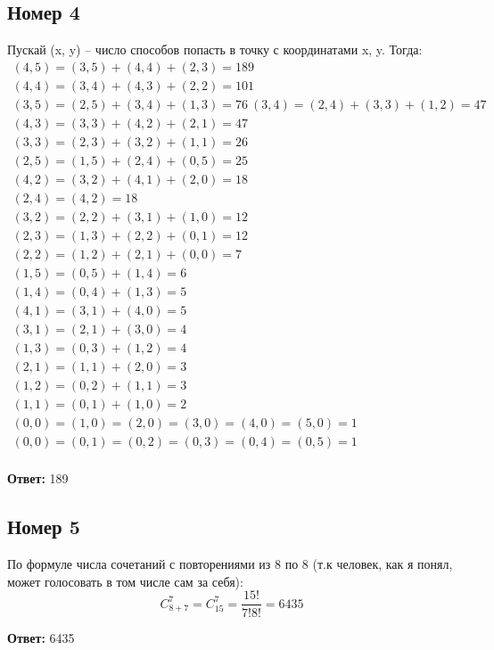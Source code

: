 \documentclass[a4paper,12pt]{article}
\begin{document}
\subsection*{Номер 4}
Пускай (x, y) -- число способов попасть в точку с координатами x, y. Тогда:
\begin{equation*}
\begin{gathered}
(4, 5) = (3, 5) + (4, 4) + (2, 3) = 189 \\
(4, 4) = (3, 4) + (4, 3) + (2, 2) = 101 \\ 
(3, 5) = (2, 5) + (3, 4) + (1, 3) = 76 \
(3, 4) = (2, 4) + (3, 3) + (1, 2) = 47 \\
(4, 3) = (3, 3) + (4, 2) + (2, 1) = 47 \\
(3, 3) = (2, 3) + (3, 2) + (1, 1) = 26\\
(2, 5) = (1, 5) + (2, 4) + (0, 5) = 25 \\
(4, 2) = (3, 2) + (4, 1) + (2, 0) = 18 \\
(2, 4) = (4, 2) = 18 \\
(3, 2) = (2, 2) + (3, 1) + (1, 0) = 12 \\
(2, 3) = (1, 3) + (2, 2) + (0, 1) = 12 \\
(2, 2) = (1, 2) + (2, 1) + (0, 0) = 7 \\ 
(1, 5) = (0,5) + (1, 4) = 6 \\
(1, 4) = (0, 4) + (1, 3) = 5\\
(4, 1) = (3, 1) + (4, 0) = 5 \\
(3, 1) = (2, 1) + (3, 0) = 4 \\
(1, 3) = (0, 3) + (1, 2) = 4 \\
(2, 1) = (1, 1) + (2, 0) = 3 \\
(1, 2) = (0, 2) + (1, 1) = 3 \\
(1, 1) = (0, 1) + (1, 0) = 2 \\
(0, 0) = (1, 0) = (2, 0) = (3, 0) = (4, 0) = (5, 0) = 1 \\
(0, 0) = (0, 1) = (0, 2) = (0, 3) = (0, 4) = (0, 5) = 1 \\
\end{gathered}
\end{equation*}
\begin{center}
\textbf{Ответ:} 189
\end{center}
\subsection*{Номер 5}
По формуле числа сочетаний с повторениями из 8 по 8 (т.к человек, как я понял, может голосовать в том числе сам за себя):
\[
C_{8 + 7}^{7} = C_{15}^7 = \frac{15!}{7!8!} = 6435
\]
\begin{center}
\textbf{Ответ:} 6435
\end{center}
\end{document}
